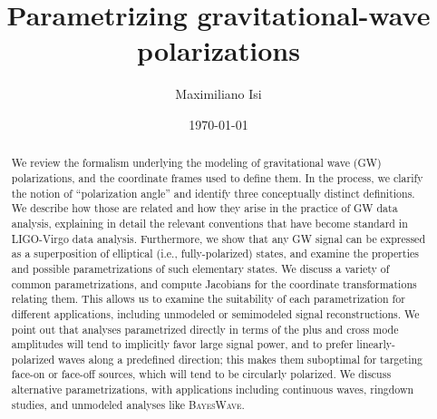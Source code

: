 \documentclass[aps,prd,twocolumn,superscriptaddress,preprintnumbers,floatfix,nofootinbib]{revtex4-2}
\newcommand{\dcc}{LIGO-P2200221}
\begin{document}

\title{Parametrizing gravitational-wave polarizations}

\author{Maximiliano Isi}




\date{\today}

\begin{abstract}
We review the formalism underlying the modeling of gravitational wave (GW) polarizations, and the coordinate frames used to define them.
In the process, we clarify the notion of ``polarization angle'' and identify three conceptually distinct definitions.
We describe how those are related and how they arise in the practice of GW data analysis, explaining in detail the relevant conventions that have become standard in LIGO-Virgo data analysis.
Furthermore, we show that any GW signal can be expressed as a superposition of elliptical (i.e., fully-polarized) states, and examine the properties and possible parametrizations of such elementary states.
We discuss a variety of common parametrizations, and compute Jacobians for the coordinate transformations relating them.
This allows us to examine the suitability of each parametrization for different applications, including unmodeled or semimodeled signal reconstructions.
We point out that analyses parametrized directly in terms of the plus and cross mode amplitudes will tend to implicitly favor large signal power, and to prefer linearly-polarized waves along a predefined direction; this makes them suboptimal for targeting face-on or face-off sources, which will tend to be circularly polarized.
We discuss alternative parametrizations, with applications including continuous waves, ringdown studies, and unmodeled analyses like \textsc{BayesWave}.
\end{abstract}
\end{document}
